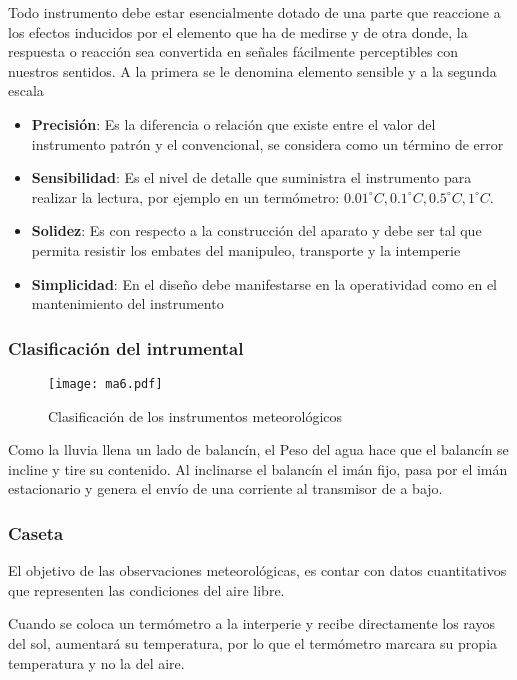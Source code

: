 Todo instrumento debe estar esencialmente dotado de una parte que reaccione a los efectos inducidos por el elemento que ha de medirse y de otra donde, la respuesta o reacción sea convertida en señales fácilmente perceptibles con nuestros sentidos. A la primera se le denomina elemento sensible y a la segunda escala

\begin{itemize}
    \item \textbf{Precisión}: Es la diferencia o relación que existe entre el valor del instrumento patrón y el convencional, se considera como un término de error
    \item \textbf{Sensibilidad}: Es el nivel de detalle que suministra el instrumento para realizar la lectura, por ejemplo en un termómetro: $0.01^{\circ}C, 0.1^{\circ}C, 0.5^{\circ}C, 1^{\circ}C$.
    \item \textbf{Solidez}: Es con respecto a la construcción del aparato y debe ser tal que permita resistir los embates del manipuleo, transporte y la intemperie
    \item \textbf{Simplicidad}: En el diseño debe manifestarse en la operatividad como en el mantenimiento del instrumento
\end{itemize}

\subsubsection{Clasificación del intrumental}

\begin{figure}[h!]
\centering
  \texttt{[image: ma6.pdf]}
  \caption{Clasificación de los instrumentos meteorológicos}
  \label{ma6}
\end{figure}

Como la lluvia llena un lado de balancín, el Peso del agua hace que el balancín se incline y tire su contenido. Al inclinarse el balancín el imán fijo, pasa por el imán estacionario y genera el envío de una corriente al transmisor de a bajo.
\subsubsection{Caseta}

El objetivo de las  observaciones meteorológicas, es contar con datos cuantitativos que representen las condiciones del aire libre.

Cuando se coloca un termómetro a la interperie y recibe directamente los rayos del sol, aumentará su temperatura, por lo que el termómetro marcara su propia temperatura y no la del aire.

